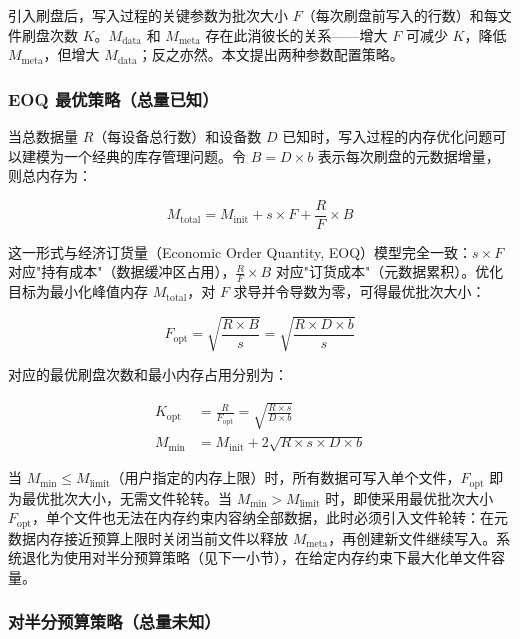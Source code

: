 引入刷盘后，写入过程的关键参数为批次大小 $F$（每次刷盘前写入的行数）和每文件刷盘次数 $K$。$M_{\text{data}}$ 和 $M_{\text{meta}}$ 存在此消彼长的关系——增大 $F$ 可减少 $K$，降低 $M_{\text{meta}}$，但增大 $M_{\text{data}}$；反之亦然。本文提出两种参数配置策略。

\subsubsection{EOQ 最优策略（总量已知）}

当总数据量 $R$（每设备总行数）和设备数 $D$ 已知时，写入过程的内存优化问题可以建模为一个经典的库存管理问题。令 $B = D \times b$ 表示每次刷盘的元数据增量，则总内存为：

\begin{equation}
  M_{\text{total}} = M_{\text{init}} + s \times F + \frac{R}{F} \times B
  \label{eq:mem-eoq}
\end{equation}

这一形式与经济订货量（Economic Order Quantity, EOQ）模型完全一致：$s \times F$ 对应"持有成本"（数据缓冲区占用），$\frac{R}{F} \times B$ 对应"订货成本"（元数据累积）。优化目标为最小化峰值内存 $M_{\text{total}}$，对 $F$ 求导并令导数为零，可得最优批次大小：

\begin{equation}
  F_{\text{opt}} = \sqrt{\frac{R \times B}{s}} = \sqrt{\frac{R \times D \times b}{s}}
  \label{eq:f-opt}
\end{equation}

对应的最优刷盘次数和最小内存占用分别为：

\begin{align}
  K_{\text{opt}} &= \frac{R}{F_{\text{opt}}} = \sqrt{\frac{R \times s}{D \times b}} \label{eq:k-opt} \\
  M_{\min} &= M_{\text{init}} + 2\sqrt{R \times s \times D \times b} \label{eq:m-min}
\end{align}

当 $M_{\min} \leq M_{\text{limit}}$（用户指定的内存上限）时，所有数据可写入单个文件，$F_{\text{opt}}$ 即为最优批次大小，无需文件轮转。当 $M_{\min} > M_{\text{limit}}$ 时，即使采用最优批次大小 $F_{\text{opt}}$，单个文件也无法在内存约束内容纳全部数据，此时必须引入文件轮转：在元数据内存接近预算上限时关闭当前文件以释放 $M_{\text{meta}}$，再创建新文件继续写入。系统退化为使用对半分预算策略（见下一小节），在给定内存约束下最大化单文件容量。

\subsubsection{对半分预算策略（总量未知）}

